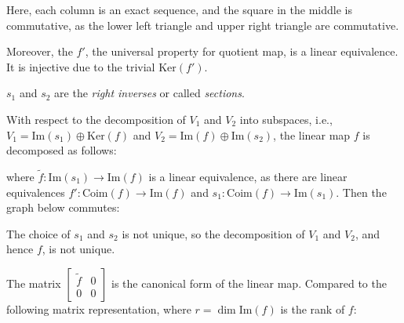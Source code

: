 \documentclass[
	11pt, %
	fleqn, %
	a4paper, %
]{LegrandOrangeBook}
\renewcommand{\ker}[1]{\text{Ker}(#1)} %
\renewcommand{\Im}[1]{\text{Im}(#1)} %
\newcommand{\F}{\mathbb{F}} %
\newcommand{\coim}[1]{\text{Coim}(#1)} %
\begin{document}
Here, each column is an exact sequence, and the square in the middle is commutative, as the lower left triangle and upper right triangle are commutative.

Moreover, the $f'$, the universal property for quotient map, is a linear equivalence. It is injective due to the trivial $\ker{f'}$. 

$s_1$ and $s_2$ are the \emph{right inverses} or called \emph{sections}.

With respect to the decomposition of $V_1$ and $V_2$ into subspaces, i.e., $V_1 = \Im{s_1} \oplus \ker{f}$ and $V_2 = \Im{f} \oplus \Im{s_2}$, the linear map $f$ is decomposed as follows:
\begin{center}
\end{center}
where $\tilde{f} : \Im{s_1} \to \Im{f}$ is a linear equivalence, as there are linear equivalences $f' : \coim{f} \to \Im{f}$ and $s_1 : \coim{f} \to \Im{s_1}$. Then the graph below commutes:

\begin{center}
\end{center}

\begin{remark}
    The choice of $s_1$ and $s_2$ is not unique, so the decomposition of $V_1$ and $V_2$, and hence $f$, is not unique.
\end{remark}

The matrix $\begin{bmatrix}
    \tilde{f} & 0 \\
    0 & 0
\end{bmatrix}$ is the canonical form of the linear map. Compared to the following matrix representation, where $r = \dim{\Im{f}}$ is the rank of $f$:
\begin{center}
\end{center}
\end{document}
